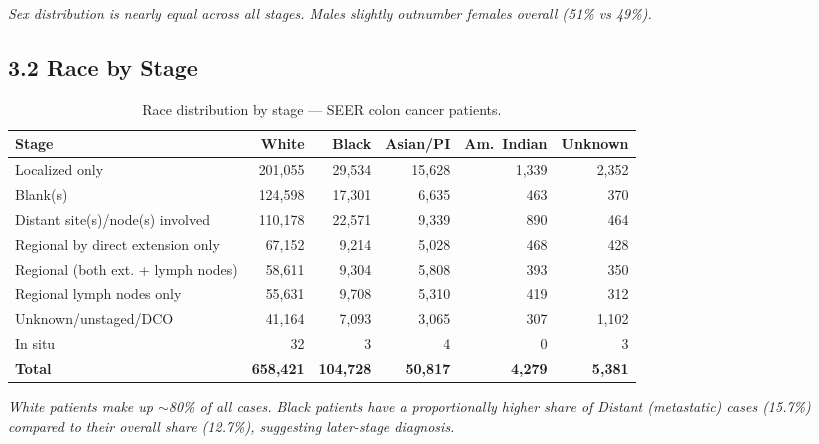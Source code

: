 \documentclass[11pt, a4paper]{article}
\begin{document}
\noindent\textit{Sex distribution is nearly equal across all stages. Males slightly outnumber females overall (51\% vs 49\%).}

\vspace{6pt}

\subsection*{3.2 Race by Stage}

\begin{table}[H]
\centering
\small
\renewcommand{\arraystretch}{1.3}
\begin{tabular}{lrrrrr}
\toprule
\textbf{Stage} & \textbf{White} & \textbf{Black} & \textbf{Asian/PI} & \textbf{Am.\ Indian} & \textbf{Unknown} \\
\midrule
Localized only                                               & 201,055 & 29,534 & 15,628 & 1,339 & 2,352 \\
Blank(s)                                                     & 124,598 & 17,301 &  6,635 &   463 &   370 \\
Distant site(s)/node(s) involved                             & 110,178 & 22,571 &  9,339 &   890 &   464 \\
Regional by direct extension only                            &  67,152 &  9,214 &  5,028 &   468 &   428 \\
Regional (both ext. + lymph nodes)                           &  58,611 &  9,304 &  5,808 &   393 &   350 \\
Regional lymph nodes only                                    &  55,631 &  9,708 &  5,310 &   419 &   312 \\
Unknown/unstaged/DCO                                         &  41,164 &  7,093 &  3,065 &   307 & 1,102 \\
In situ                                                      &      32 &      3 &      4 &     0 &     3 \\
\midrule
\textbf{Total}                                               & \textbf{658,421} & \textbf{104,728} & \textbf{50,817} & \textbf{4,279} & \textbf{5,381} \\
\bottomrule
\end{tabular}
\caption{Race distribution by stage --- SEER colon cancer patients.}
\end{table}

\noindent\textit{White patients make up $\sim$80\% of all cases. Black patients have a proportionally higher share of Distant (metastatic) cases (15.7\%) compared to their overall share (12.7\%), suggesting later-stage diagnosis.}
\end{document}
